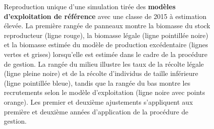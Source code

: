\documentclass[11pt]{book}
\begin{document}
\newpage
\begin{landscape}
\begin{figure}[htb]

{\centering {} 

}

\caption{Reproduction unique d’une simulation tirée des \textbf{modèles d’exploitation de référence} avec une classe de 2015 à estimation élevée. La première rangée de panneaux montre la biomasse du stock reproducteur (ligne rouge), la biomasse légale (ligne pointillée noire) et la biomasse estimée du modèle de production excédentaire (lignes vertes et grises) lorsqu’elle est estimée dans le cadre de la procédure de gestion. La rangée du milieu illustre les taux de la récolte légale (ligne pleine noire) et de la récolte d’individus de taille inférieure (ligne pointillée bleue), tandis que la rangée du bas montre les recrutements selon le modèle d’exploitation (ligne noire avec points orange). Les premier et deuxième ajustements s’appliquent aux première et deuxième années d’application de la procédure de gestion.}\label{fig:unnamed-chunk-22}
\end{figure}
\newpage
\begin{figure}[htb]

{\centering {} 

}
\end{figure}
\end{landscape}
\end{document}
